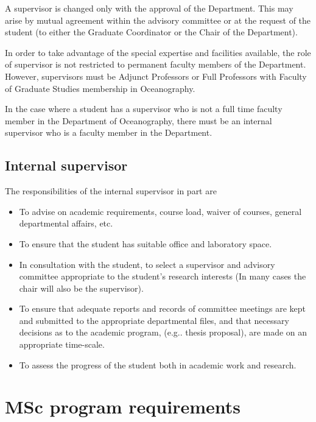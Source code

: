 \documentclass{article}
\begin{document}
A supervisor is changed only with the approval of the Department. This may
arise by mutual agreement within the advisory committee or at the request of
the student (to either the Graduate Coordinator or the Chair of the
Department).

In order to take advantage of the special expertise and facilities available,
the role of supervisor is not restricted to permanent faculty members of the
Department. However, supervisors must be Adjunct Professors or Full Professors
with Faculty of Graduate Studies membership in Oceanography.

In the case where a student has a supervisor who is not a full time faculty
member in the Department of Oceanography, there must be an internal supervisor
who is a faculty member in the Department.

\subsection{Internal supervisor}

The responsibilities of the internal supervisor in part are
\begin{itemize}
\item To advise on academic requirements, course load, waiver of courses, general departmental affairs, etc.
\item To ensure that the student has suitable office and laboratory space.
\item In consultation with the student, to select a supervisor and advisory committee appropriate to the student's research interests (In many cases the chair will also be the supervisor).
\item To ensure that adequate reports and records of committee meetings are kept and submitted to the appropriate departmental files, and that necessary decisions as to the academic program, (e.g.. thesis proposal), are made on an appropriate time-scale.
\item To assess the progress of the student both in academic work and research.
\end {itemize}
 


\section{\label{sec:msc_program_requirements}MSc program requirements}

\end{document}

